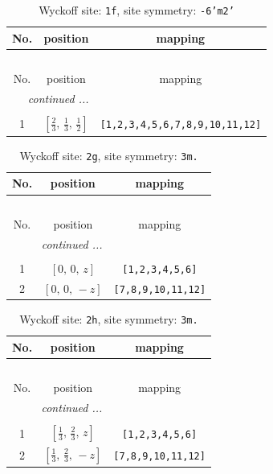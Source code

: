 \documentclass[fleqn,8pt]{jsarticle}
\begin{document}
\renewcommand{\arraystretch}{1.2}
\begin{longtable}{ccc}
\caption{Wyckoff site: {\tt 1f}, site symmetry: {\tt -6'm2'}}
 \\
 \hline \hline
No. & position & mapping \\ \hline \endfirsthead

\multicolumn{2}{l}{\tablename\ \thetable{}} \\
 \hline \hline
No. & position & mapping \\ \hline \endhead

 \hline \hline
\multicolumn{2}{r}{\footnotesize\it continued ...} \\ \endfoot

 \hline \hline
\multicolumn{2}{r}{} \\ \endlastfoot

1 & $\left[ \frac{2}{3},\, \frac{1}{3},\, \frac{1}{2} \right]$ & {\tt [1,2,3,4,5,6,7,8,9,10,11,12]} \\
\end{longtable}
\renewcommand{\arraystretch}{1.2}
\begin{longtable}{ccc}
\caption{Wyckoff site: {\tt 2g}, site symmetry: {\tt 3m.}}
 \\
 \hline \hline
No. & position & mapping \\ \hline \endfirsthead

\multicolumn{2}{l}{\tablename\ \thetable{}} \\
 \hline \hline
No. & position & mapping \\ \hline \endhead

 \hline \hline
\multicolumn{2}{r}{\footnotesize\it continued ...} \\ \endfoot

 \hline \hline
\multicolumn{2}{r}{} \\ \endlastfoot

1 & $\left[ 0,\, 0,\, z \right]$ & {\tt [1,2,3,4,5,6]} \\ \hline
2 & $\left[ 0,\, 0,\, - z \right]$ & {\tt [7,8,9,10,11,12]} \\
\end{longtable}
\renewcommand{\arraystretch}{1.2}
\begin{longtable}{ccc}
\caption{Wyckoff site: {\tt 2h}, site symmetry: {\tt 3m.}}
 \\
 \hline \hline
No. & position & mapping \\ \hline \endfirsthead

\multicolumn{2}{l}{\tablename\ \thetable{}} \\
 \hline \hline
No. & position & mapping \\ \hline \endhead

 \hline \hline
\multicolumn{2}{r}{\footnotesize\it continued ...} \\ \endfoot

 \hline \hline
\multicolumn{2}{r}{} \\ \endlastfoot

1 & $\left[ \frac{1}{3},\, \frac{2}{3},\, z \right]$ & {\tt [1,2,3,4,5,6]} \\ \hline
2 & $\left[ \frac{1}{3},\, \frac{2}{3},\, - z \right]$ & {\tt [7,8,9,10,11,12]} \\
\end{longtable}
\end{document}

